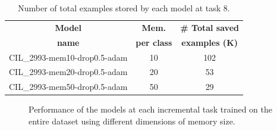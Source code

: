 \begin{table}[H]
    \centering
    \begin{tabular}{c|c|c}
        \hline
        \textbf{Model} &
        \textbf{Mem.} &
        \textbf{\# Total saved} \\
        \textbf{name} &
        \textbf{per class} &
        \textbf{examples (K)} \\
        \hline
        \hline
CIL\_2993-mem10-drop0.5-adam&10&102\\
CIL\_2993-mem20-drop0.5-adam&20&53\\
CIL\_2993-mem50-drop0.5-adam&50&29\\
        \hline
    \end{tabular}
    \caption{Number of total examples stored by each model at task 8.}
    \label{table:exp6-memsize}
\end{table}


\begin{figure}[H]
	\centering
    \qquad
	\caption{Performance of the models at each incremental task trained on the entire dataset using different dimensions of memory size.}%
	\label{fig:exp6}%
\end{figure}

\newpage


